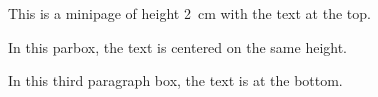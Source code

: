 \documentclass{article}
\begin{document}
\begin{minipage}[t][2cm][t]{3cm}
	This is a minipage of height 2~cm with the text
at the top.
\end{minipage} \hrulefill
\parbox[t][2cm][c]{3cm}{In this parbox, the text
is centered on the same height.} \hrulefill
\begin{minipage}[t][2cm][b]{3cm}
	In this third paragraph box, the text is at the bottom.
\end{minipage}
\end{document}

